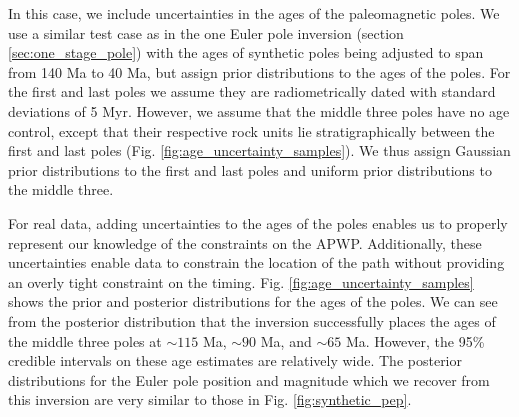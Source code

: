 \documentclass[11pt,letterpaper]{article}
\begin{document}
In this case, we include uncertainties in the ages of the paleomagnetic poles. We use a similar test case as in the one Euler pole inversion (section \ref{sec:one_stage_pole}) with the ages of synthetic poles being adjusted to span from 140 Ma to 40 Ma, but assign prior distributions to the ages of the poles. For the first and last poles we assume they are radiometrically dated with standard deviations of 5 Myr. However, we assume that the middle three poles have no age control, except that their respective rock units lie stratigraphically between the first and last poles (Fig. \ref{fig:age_uncertainty_samples}). We thus assign Gaussian prior distributions to the first and last poles and uniform prior distributions to the middle three.

For real data, adding uncertainties to the ages of the poles enables us to properly represent our knowledge of the constraints on the APWP. Additionally, these uncertainties enable data to constrain the location of the path without providing an overly tight constraint on the timing.
Fig. \ref{fig:age_uncertainty_samples} shows the prior and posterior distributions for the ages of the poles. We can see from the posterior distribution that the inversion successfully places the ages of the middle three poles at $\sim115$ Ma, $\sim90$ Ma,  and $\sim65$ Ma. However, the 95\% credible intervals on these age estimates are relatively wide. The posterior distributions for the Euler pole position and magnitude which we recover from this inversion are very similar to those in Fig. \ref{fig:synthetic_pep}.
\end{document}

